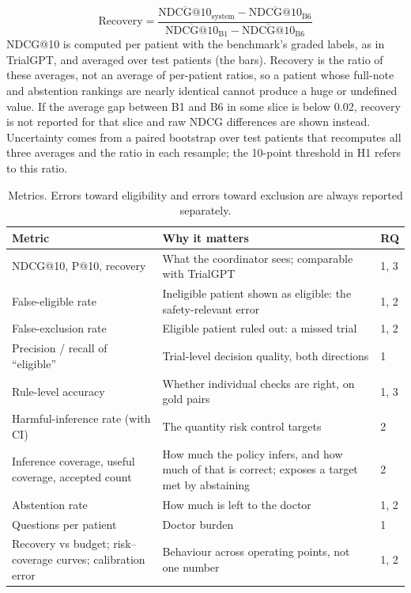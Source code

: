 \documentclass[10pt,a4paper]{article}
\begin{document}
\begin{equation}\label{eq:rec}
\text{Recovery}=\frac{\overline{\mathrm{NDCG@10}}_{\text{system}}-\overline{\mathrm{NDCG@10}}_{\text{B6}}}{\overline{\mathrm{NDCG@10}}_{\text{B1}}-\overline{\mathrm{NDCG@10}}_{\text{B6}}}
\end{equation}
NDCG@10 is computed per patient with the benchmark's graded labels, as in TrialGPT, and averaged over test patients (the bars). Recovery is the ratio of these averages, not an average of per-patient ratios, so a patient whose full-note and abstention rankings are nearly identical cannot produce a huge or undefined value. If the average gap between B1 and B6 in some slice is below 0.02, recovery is not reported for that slice and raw NDCG differences are shown instead. Uncertainty comes from a paired bootstrap over test patients that recomputes all three averages and the ratio in each resample; the 10-point threshold in H1 refers to this ratio.

\begin{table}[H]
\centering\footnotesize
\begin{tabularx}{\textwidth}{@{}P{4.1cm}LP{1.1cm}@{}}
\toprule
\textbf{Metric} & \textbf{Why it matters} & \textbf{RQ}\\
\midrule
NDCG@10, P@10, recovery & What the coordinator sees; comparable with TrialGPT & 1, 3\\
False-eligible rate & Ineligible patient shown as eligible: the safety-relevant error & 1, 2\\
False-exclusion rate & Eligible patient ruled out: a missed trial & 1, 2\\
Precision / recall of ``eligible'' & Trial-level decision quality, both directions & 1\\
Rule-level accuracy & Whether individual checks are right, on gold pairs & 1, 3\\
Harmful-inference rate (with CI) & The quantity risk control targets & 2\\
Inference coverage, useful coverage, accepted count & How much the policy infers, and how much of that is correct; exposes a target met by abstaining & 2\\
Abstention rate & How much is left to the doctor & 1, 2\\
Questions per patient & Doctor burden & 1\\
Recovery vs budget; risk--coverage curves; calibration error & Behaviour across operating points, not one number & 1, 2\\
\bottomrule
\end{tabularx}
\caption{Metrics. Errors toward eligibility and errors toward exclusion are always reported separately.}
\end{table}
\end{document}
